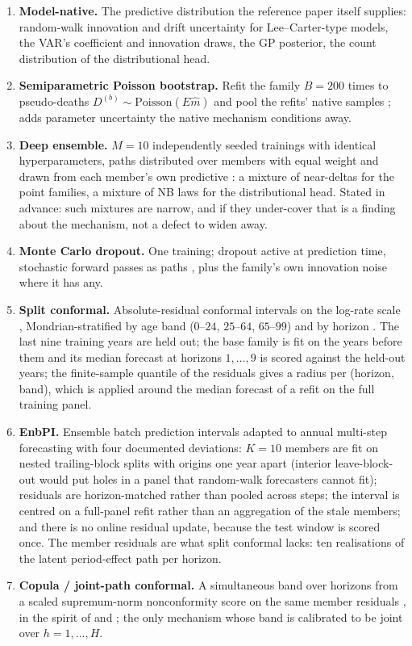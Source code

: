 \begin{enumerate}
\item \textbf{Model-native.} The predictive distribution the reference paper
  itself supplies: random-walk innovation and drift uncertainty for
  Lee--Carter-type models, the VAR's coefficient and innovation draws, the
  GP posterior, the count distribution of the distributional head.
\item \textbf{Semiparametric Poisson bootstrap.} Refit the family $B=200$
  times to pseudo-deaths $D^{(b)}\sim\mathrm{Poisson}(E\hat m)$ and pool the
  refits' native samples \citep{brouhns2005bootstrapping}; adds parameter
  uncertainty the native mechanism conditions away.
\item \textbf{Deep ensemble.} $M=10$ independently seeded trainings with
  identical hyperparameters, paths distributed over members with equal
  weight and drawn from each member's own predictive
  \citep{lakshminarayanan2017simple}: a mixture of near-deltas for the
  point families, a mixture of NB laws for the distributional head. Stated
  in advance: such mixtures are narrow, and if they under-cover that is a
  finding about the mechanism, not a defect to widen away.
\item \textbf{Monte Carlo dropout.} One training; dropout active at
  prediction time, stochastic forward passes as paths \citep{gal2016dropout},
  plus the family's own innovation noise where it has any.
\item \textbf{Split conformal.} Absolute-residual conformal intervals on the
  log-rate scale \citep{lei2018distribution}, Mondrian-stratified by age
  band ($0$--$24$, $25$--$64$, $65$--$99$) and by horizon
  \citep{vovk2005algorithmic}. The last nine training years are held out;
  the base family is fit on the years before them and its median forecast
  at horizons $1,\dots,9$ is scored against the held-out years; the
  finite-sample quantile of the residuals gives a radius per (horizon,
  band), which is applied around the median forecast of a refit on the
  full training panel.
\item \textbf{EnbPI.} Ensemble batch prediction intervals \citep{xu2021conformal}
  adapted to annual multi-step forecasting with four documented deviations:
  $K=10$ members are fit on nested trailing-block splits with origins one
  year apart (interior leave-block-out would put holes in a panel that
  random-walk forecasters cannot fit); residuals are horizon-matched rather
  than pooled across steps; the interval is centred on a full-panel refit
  rather than an aggregation of the stale members; and there is no online
  residual update, because the test window is scored once. The member
  residuals are what split conformal lacks: ten realisations of the latent
  period-effect path per horizon.
\item \textbf{Copula / joint-path conformal.} A simultaneous band over
  horizons from a scaled supremum-norm nonconformity score on the same
  member residuals \citep{diquigiovanni2022conformal}, in the spirit of
  \citet{sun2024copula} and \citet{messoudi2021copula}; the only mechanism
  whose band is calibrated to be joint over $h=1,\dots,H$.
\end{enumerate}

